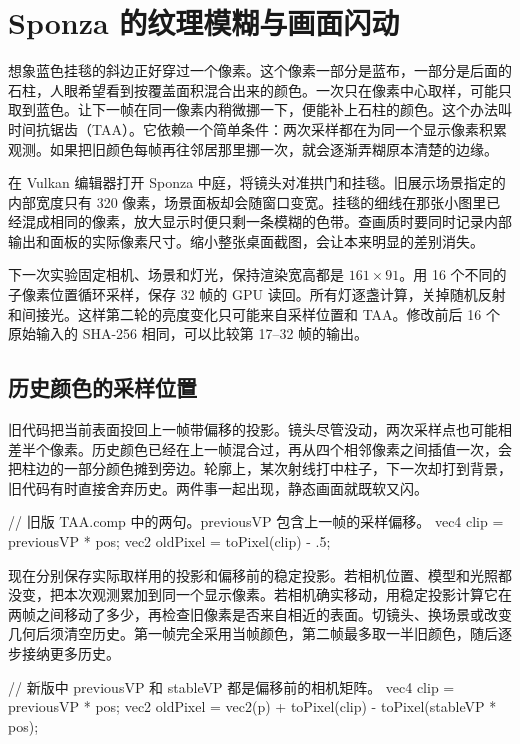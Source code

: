 \newpage
\section{Sponza 的纹理模糊与画面闪动}
\begingroup
\setlength{\parindent}{2\ccwd}
\setlength{\parskip}{5pt}
想象蓝色挂毯的斜边正好穿过一个像素。这个像素一部分是蓝布，一部分是后面的石柱，人眼希望看到按覆盖面积混合出来的颜色。一次只在像素中心取样，可能只取到蓝色。让下一帧在同一像素内稍微挪一下，便能补上石柱的颜色。这个办法叫时间抗锯齿（TAA）。它依赖一个简单条件：两次采样都在为同一个显示像素积累观测。如果把旧颜色每帧再往邻居那里挪一次，就会逐渐弄糊原本清楚的边缘。

在 Vulkan 编辑器打开 Sponza 中庭，将镜头对准拱门和挂毯。旧展示场景指定的内部宽度只有 320 像素，场景面板却会随窗口变宽。挂毯的细线在那张小图里已经混成相同的像素，放大显示时便只剩一条模糊的色带。查画质时要同时记录内部输出和面板的实际像素尺寸。缩小整张桌面截图，会让本来明显的差别消失。

下一次实验固定相机、场景和灯光，保持渲染宽高都是 $161\times91$。用 16 个不同的子像素位置循环采样，保存 32 帧的 GPU 读回。所有灯逐盏计算，关掉随机反射和间接光。这样第二轮的亮度变化只可能来自采样位置和 TAA。修改前后 16 个原始输入的 SHA-256 相同，可以比较第 17--32 帧的输出。

\subsection{历史颜色的采样位置}
旧代码把当前表面投回上一帧带偏移的投影。镜头尽管没动，两次采样点也可能相差半个像素。历史颜色已经在上一帧混合过，再从四个相邻像素之间插值一次，会把柱边的一部分颜色摊到旁边。轮廓上，某次射线打中柱子，下一次却打到背景，旧代码有时直接舍弃历史。两件事一起出现，静态画面就既软又闪。

\begin{Code}
// 旧版 TAA.comp 中的两句。previousVP 包含上一帧的采样偏移。
vec4 clip = previousVP * pos;
vec2 oldPixel = toPixel(clip) - .5;
\end{Code}
现在分别保存实际取样用的投影和偏移前的稳定投影。若相机位置、模型和光照都没变，把本次观测累加到同一个显示像素。若相机确实移动，用稳定投影计算它在两帧之间移动了多少，再检查旧像素是否来自相近的表面。切镜头、换场景或改变几何后须清空历史。第一帧完全采用当帧颜色，第二帧最多取一半旧颜色，随后逐步接纳更多历史。

\begin{Code}
// 新版中 previousVP 和 stableVP 都是偏移前的相机矩阵。
vec4 clip = previousVP * pos;
vec2 oldPixel = vec2(p) + toPixel(clip) - toPixel(stableVP * pos);
\end{Code}

